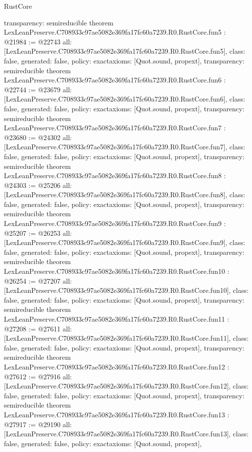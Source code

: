 \begin{lexlean}{RustCore}
\begin{coremodule}
{  transparency: semireducible
}
theorem LexLeanPreserve.C708933c97ae5082e369fa17fc60a7239.R0.RustCore.fun5 : @21984 := @22743 {
  all: [LexLeanPreserve.C708933c97ae5082e369fa17fc60a7239.R0.RustCore.fun5],
  class: false,
  generated: false,
  policy: exact{axioms: [Quot.sound, propext]},
  transparency: semireducible
}
theorem LexLeanPreserve.C708933c97ae5082e369fa17fc60a7239.R0.RustCore.fun6 : @22744 := @23679 {
  all: [LexLeanPreserve.C708933c97ae5082e369fa17fc60a7239.R0.RustCore.fun6],
  class: false,
  generated: false,
  policy: exact{axioms: [Quot.sound, propext]},
  transparency: semireducible
}
theorem LexLeanPreserve.C708933c97ae5082e369fa17fc60a7239.R0.RustCore.fun7 : @23680 := @24302 {
  all: [LexLeanPreserve.C708933c97ae5082e369fa17fc60a7239.R0.RustCore.fun7],
  class: false,
  generated: false,
  policy: exact{axioms: [Quot.sound, propext]},
  transparency: semireducible
}
theorem LexLeanPreserve.C708933c97ae5082e369fa17fc60a7239.R0.RustCore.fun8 : @24303 := @25206 {
  all: [LexLeanPreserve.C708933c97ae5082e369fa17fc60a7239.R0.RustCore.fun8],
  class: false,
  generated: false,
  policy: exact{axioms: [Quot.sound, propext]},
  transparency: semireducible
}
theorem LexLeanPreserve.C708933c97ae5082e369fa17fc60a7239.R0.RustCore.fun9 : @25207 := @26253 {
  all: [LexLeanPreserve.C708933c97ae5082e369fa17fc60a7239.R0.RustCore.fun9],
  class: false,
  generated: false,
  policy: exact{axioms: [Quot.sound, propext]},
  transparency: semireducible
}
theorem LexLeanPreserve.C708933c97ae5082e369fa17fc60a7239.R0.RustCore.fun10 : @26254 := @27207 {
  all: [LexLeanPreserve.C708933c97ae5082e369fa17fc60a7239.R0.RustCore.fun10],
  class: false,
  generated: false,
  policy: exact{axioms: [Quot.sound, propext]},
  transparency: semireducible
}
theorem LexLeanPreserve.C708933c97ae5082e369fa17fc60a7239.R0.RustCore.fun11 : @27208 := @27611 {
  all: [LexLeanPreserve.C708933c97ae5082e369fa17fc60a7239.R0.RustCore.fun11],
  class: false,
  generated: false,
  policy: exact{axioms: [Quot.sound, propext]},
  transparency: semireducible
}
theorem LexLeanPreserve.C708933c97ae5082e369fa17fc60a7239.R0.RustCore.fun12 : @27612 := @27916 {
  all: [LexLeanPreserve.C708933c97ae5082e369fa17fc60a7239.R0.RustCore.fun12],
  class: false,
  generated: false,
  policy: exact{axioms: [Quot.sound, propext]},
  transparency: semireducible
}
theorem LexLeanPreserve.C708933c97ae5082e369fa17fc60a7239.R0.RustCore.fun13 : @27917 := @29190 {
  all: [LexLeanPreserve.C708933c97ae5082e369fa17fc60a7239.R0.RustCore.fun13],
  class: false,
  generated: false,
  policy: exact{axioms: [Quot.sound, propext]},
}
\end{coremodule}
\end{lexlean}
